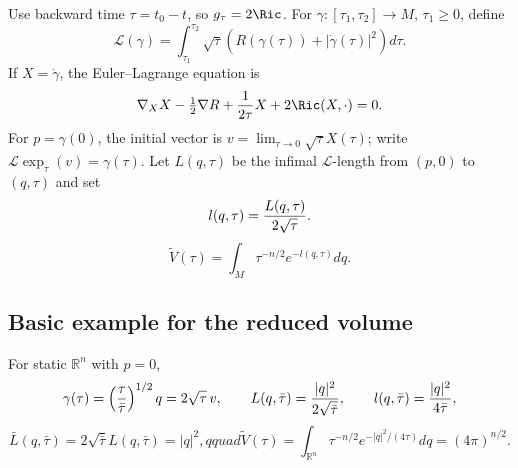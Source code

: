 Use backward time $\tau=t_0-t$, so $g_\tau=2\Ric$. For
$\gamma:[\tau_1,\tau_2]\to M$, $\tau_1\ge0$, define
\begin{equation}\label{defL}
{\mathcal L}(\gamma)=\int_{\tau_1}^{\tau_2}\sqrt\tau\left(R(\gamma(\tau))+|\dot\gamma(\tau)|^2\right)d\tau.
\end{equation}
If $X=\dot\gamma$, the Euler--Lagrange equation is
\begin{equation}
\nabla_XX-\tfrac12\nabla R+{1\over2\tau}X+2\Ric(X,\cdot)=0.
\end{equation}
For $p=\gamma(0)$, the initial vector is $v=\lim_{\tau\to0}\sqrt\tau X(\tau)$;
write ${\mathcal L}\exp_\tau(v)=\gamma(\tau)$. Let $L(q,\tau)$ be the infimal
${\mathcal L}$-length from $(p,0)$ to $(q,\tau)$ and set
\begin{equation}\label{reducedl}l(q,\tau)={L(q,\tau)\over2\sqrt\tau}.
\end{equation}
\begin{equation}\label{reducedv}\tilde V(\tau)=\int_M\tau^{-n/2}e^{-l(q,\tau)}dq.
\end{equation}

\subsection{Basic example for the reduced volume} \label{7Euclidean}
For static $\mathbb R^n$ with $p=0$,
\begin{equation}
\gamma(\tau)=\left({\tau\over\bar\tau}\right)^{1/2}q=2\sqrt\tau\,v,\qquad
L(q,\bar\tau)={|q|^2\over2\sqrt{\bar\tau}},\qquad l(q,\bar\tau)={|q|^2\over4\bar\tau},
\end{equation}
\begin{equation}
\bar L(q,\bar\tau)=2\sqrt{\bar\tau}L(q,\bar\tau)=|q|^2,qquad
\tilde V(\tau)=\int_{\mathbb R^n}\tau^{-n/2}e^{-|q|^2/(4\tau)}dq=(4\pi)^{n/2}.
\end{equation}

